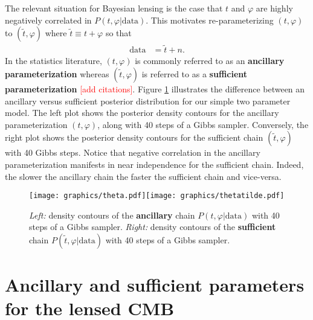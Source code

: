 \documentclass[noinfoline]{imsart}
\begin{document}
The relevant situation for Bayesian lensing is the case that $ t$ and $\varphi$ are highly negatively correlated in $P( t, \varphi|\text{data})$.  This motivates re-parameterizing $( t,\varphi)$ to $(\widetilde  t, \varphi)$ where $\widetilde  t \equiv  t + \varphi$ so that
\begin{align*}
\text{data} &= \widetilde  t + n.
\end{align*}
In the statistics literature,  $( t, \varphi)$ is commonly referred to as an {\bf ancillary parameterization} whereas $(\widetilde  t, \varphi)$ is referred to as a {\bf sufficient parameterization} \textcolor{red}{[add citations]}. Figure  \ref{fastslowGibbs} illustrates the difference between an ancillary versus sufficient posterior distribution for our simple two parameter model. The left plot shows the posterior density contours for the ancillary parameterization $( t, \varphi)$, along with 40 steps of a Gibbs sampler.  Conversely, the right plot shows the posterior density contours for the sufficient chain $(\widetilde  t, \varphi)$ with 40 Gibbs steps. Notice that negative correlation  in the ancillary parameterization manifests in near independence for the sufficient chain.  Indeed, the slower the ancillary chain the faster the sufficient chain and vice-versa. 
\begin{figure}[H]
\label{fastslowGibbs}
\texttt{[image: graphics/theta.pdf]}\texttt{[image: graphics/thetatilde.pdf]}
\caption{{\em Left:} density contours of the {\bf ancillary} chain $P( t, \varphi|\text{data})$ with 40 steps of a Gibbs sampler. {\em Right:} density contours of the {\bf sufficient}  chain $P(\widetilde  t, \varphi|\text{data})$ with 40 steps of a Gibbs sampler.}
\end{figure}
 







	
%
%
\section{Ancillary and sufficient parameters for the lensed CMB}
\label{Section: Ancillary and sufficient parameters for the lensed CMB}
\end{document}
